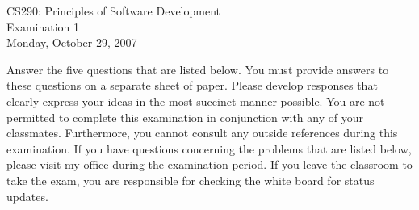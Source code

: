 \documentclass{article}
\def\widow#1{\vskip #1\vbadness10000\penalty-200\vskip-#1}
\theoremstyle{definition}
\begin{document}
\def\widow#1{\vskip #1\vbadness10000\penalty-200\vskip-#1}

\begin{center}

CS290: Principles of Software Development \\
Examination 1 \\
Monday, October 29, 2007 \\

\end{center}

\noindent
Answer the five questions that are listed below.  You must provide
answers to these questions on a separate sheet of paper.  Please
develop responses that clearly express your ideas in the most succinct
manner possible.  You are not permitted to complete this examination
in conjunction with any of your classmates.  Furthermore, you cannot
consult any outside references during this examination.  If you have
questions concerning the problems that are listed below, please visit
my office during the examination period.  If you leave the classroom
to take the exam, you are responsible for checking the white board for
status updates.


\vspace*{.2in}
\end{document}
